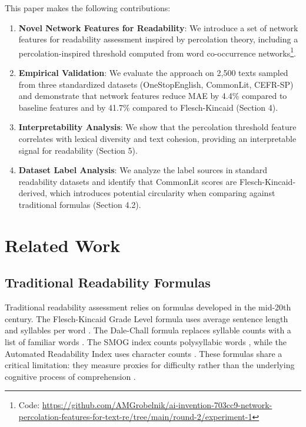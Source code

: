 \documentclass[11pt,letterpaper]{article}
\begin{document}
This paper makes the following contributions:

\begin{enumerate}
\item \textbf{Novel Network Features for Readability}: We introduce a set of network features for readability assessment inspired by percolation theory, including a percolation-inspired threshold computed from word co-occurrence networks\footnote{Code: \url{https://github.com/AMGrobelnik/ai-invention-703cc9-network-percolation-features-for-text-re/tree/main/round-2/experiment-1}}.

\item \textbf{Empirical Validation}: We evaluate the approach on 2,500 texts sampled from three standardized datasets (OneStopEnglish, CommonLit, CEFR-SP) and demonstrate that network features reduce MAE by 4.4\% compared to baseline features and by 41.7\% compared to Flesch-Kincaid (Section 4).

\item \textbf{Interpretability Analysis}: We show that the percolation threshold feature correlates with lexical diversity and text cohesion, providing an interpretable signal for readability (Section 5).

\item \textbf{Dataset Label Analysis}: We analyze the label sources in standard readability datasets and identify that CommonLit scores are Flesch-Kincaid-derived, which introduces potential circularity when comparing against traditional formulas (Section 4.2).
\end{enumerate}

\section{Related Work}

\subsection{Traditional Readability Formulas}

Traditional readability assessment relies on formulas developed in the mid-20th century. The Flesch-Kincaid Grade Level formula uses average sentence length and syllables per word \cite{Flesch1948}. The Dale-Chall formula replaces syllable counts with a list of familiar words \cite{Dale1948}. The SMOG index counts polysyllabic words \cite{McLaughlin1969}, while the Automated Readability Index uses character counts \cite{Senter1967}. These formulas share a critical limitation: they measure proxies for difficulty rather than the underlying cognitive process of comprehension \cite{CollinsThompson2014,Redish2000}.
\end{document}
